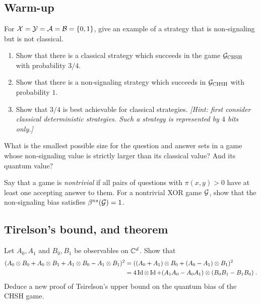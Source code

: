 \chapter{}


\section{Warm-up}

\begin{exercise}
For $\mathcal{X}=\mathcal{Y}=\mathcal{A}=\mathcal{B}=\{0,1\}$, give an example of a strategy that is non-signaling but is not classical. 
\end{exercise}


\begin{exercise}
\begin{enumerate}
\item Show that there is a classical strategy which succeeds in the game $\mathcal{G}_{\textsc{CHSH}}$ with probability $3/4$.
\item Show that there is a non-signaling strategy which succeeds in $\mathcal{G}_{\textsc{CHSH}}$ with probability $1$.  
\item Show that $3/4$ is best achievable for classical strategies. \emph{[Hint: first consider classical deterministic strategies. Such a strategy is represented by $4$ bits only.]}
\end{enumerate}
\end{exercise}

\begin{exercise}
What is the smallest possible size for the question and answer sets in a game whose non-signaling value is strictly larger than its classical value? And its quantum value? 
\end{exercise}

\begin{exercise}
Say that a game is \emph{nontrivial} if all pairs of questions with $\pi(x,y)>0$ have at least one accepting answer to them. For a nontrivial XOR game $\mathcal{G}$, show that the non-signaling bias satisfies $\beta^{ns}(\mathcal{G})=1$.
\end{exercise}

\section{Tirelson's bound, and theorem}


\begin{exercise}
Let $A_0,A_1$ and $B_0,B_1$ be observables on $\mathbb{C}^d$. Show that
\begin{align}
(A_0\otimes B_0 + A_0\otimes B_1 + A_1\otimes B_0 - A_1\otimes B_1 )^2 &=( (A_0+A_1)\otimes B_0 + (A_0-A_1)\otimes B_1 )^2\label{eq:bellop}\\
&= 4\mathop{\rm Id}\nolimits\otimes \mathop{\rm Id}\nolimits + (A_1A_0-A_0A_1)\otimes (B_0B_1-B_1B_0)\;.\notag
\end{align}
Deduce a new proof of Tsirelson's upper bound on the quantum bias of the CHSH game. 
\end{exercise}

